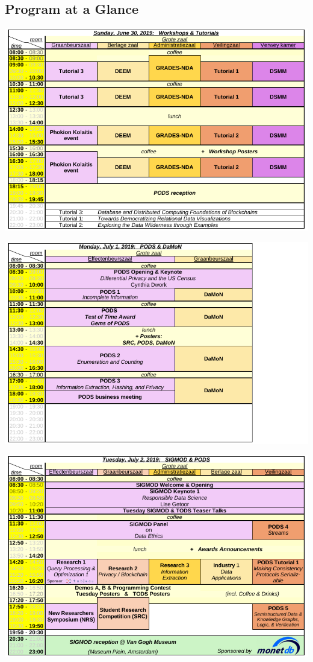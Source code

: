 \begin{landscape}

\section*{Program at a Glance}

\includegraphics{schedule/p1.pdf}

\includegraphics{schedule/p2.pdf}

\includegraphics{schedule/p3.pdf}


\end{landscape}
